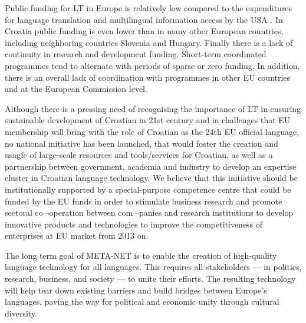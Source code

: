 \begin{multicols}{2}
Public funding for LT in Europe is relatively low compared to the expenditures for language translation and multilingual information access by the USA \cite{str36}. In Croatia public funding is even lower than in many other European countries, including neighboring countries Slovenia and Hungary. Finally there is a lack of continuity in research and development funding. Short-term coordinated programmes tend to alternate with periods of sparse or zero funding. In addition, there is an overall lack of coordination with programmes in other EU countries and at the European Commission level.

Although there is a pressing need of recognising the importance of LT in ensuring sustainable development of Croatian in 21st century and in challenges that EU membership will bring with the role of Croatian as the 24th EU official language, no national initiative has been launched, that would foster the creation and usagfe of large-scale resources and tools/services for Croatian, as well as a partnership between government, academia and industry to develop an expertise cluster in Croatian language technology. We believe that this initiative should be institutionally supported by a special-purpose competence centre that could be funded by the EU funds in order to stimulate business research and promote sectoral co¬operation between com¬panies and research institutions to develop innovative products and technologies to improve the competitiveness of enterprises at EU market from 2013 on.

The long term goal of META-NET is to enable the creation of high-quality language technology for all languages. This requires all stakeholders — in politics, research, business, and society — to unite their efforts. The resulting technology will help tear down existing barriers and build bridges between Europe’s languages, paving the way for political and economic unity through cultural diversity.

\end{multicols}
\clearpage
